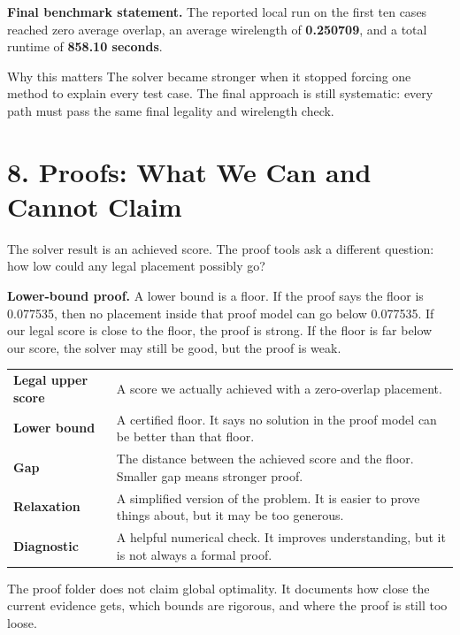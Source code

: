 \documentclass[11pt]{article}
\begin{document}
\begin{resultbox}
\textbf{Final benchmark statement.} The reported local run on the first ten cases reached zero average overlap, an average wirelength of \textbf{0.250709}, and a total runtime of \textbf{858.10 seconds}.
\end{resultbox}

\begin{plainbox}{Why this matters}
The solver became stronger when it stopped forcing one method to explain every test case. The final approach is still systematic: every path must pass the same final legality and wirelength check.
\end{plainbox}

\newpage

\section{8. Proofs: What We Can and Cannot Claim}

The solver result is an achieved score. The proof tools ask a different question: how low could any legal placement possibly go?

\begin{proofbox}
\textbf{Lower-bound proof.} A lower bound is a floor. If the proof says the floor is 0.077535, then no placement inside that proof model can go below 0.077535. If our legal score is close to the floor, the proof is strong. If the floor is far below our score, the solver may still be good, but the proof is weak.
\end{proofbox}

\begin{tabularx}{\textwidth}{>{\bfseries\color{navy}}p{}X}
Legal upper score & A score we actually achieved with a zero-overlap placement. \\
Lower bound & A certified floor. It says no solution in the proof model can be better than that floor. \\
Gap & The distance between the achieved score and the floor. Smaller gap means stronger proof. \\
Relaxation & A simplified version of the problem. It is easier to prove things about, but it may be too generous. \\
Diagnostic & A helpful numerical check. It improves understanding, but it is not always a formal proof. \\
\end{tabularx}

\begin{warningbox}
The proof folder does not claim global optimality. It documents how close the current evidence gets, which bounds are rigorous, and where the proof is still too loose.
\end{warningbox}
\end{document}
